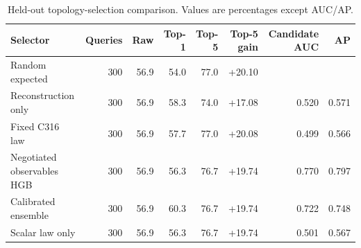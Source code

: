 \begin{table}[t]
\centering
\begin{tabular}{lrrrrrrr}
\toprule
Selector & Queries & Raw & Top-1 & Top-5 & Top-5 gain & Candidate AUC & AP \\
\midrule
Random expected & 300 & 56.9 & 54.0 & 77.0 & +20.10 &  &  \\
Reconstruction only & 300 & 56.9 & 58.3 & 74.0 & +17.08 & 0.520 & 0.571 \\
Fixed C316 law & 300 & 56.9 & 57.7 & 77.0 & +20.08 & 0.499 & 0.566 \\
Negotiated observables HGB & 300 & 56.9 & 56.3 & 76.7 & +19.74 & 0.770 & 0.797 \\
Calibrated ensemble & 300 & 56.9 & 60.3 & 76.7 & +19.74 & 0.722 & 0.748 \\
Scalar law only & 300 & 56.9 & 56.3 & 76.7 & +19.74 & 0.501 & 0.567 \\
\bottomrule
\end{tabular}
\caption{Held-out topology-selection comparison. Values are percentages except AUC/AP.}
\label{tab:ngc\_selector\_comparison}
\end{table}
